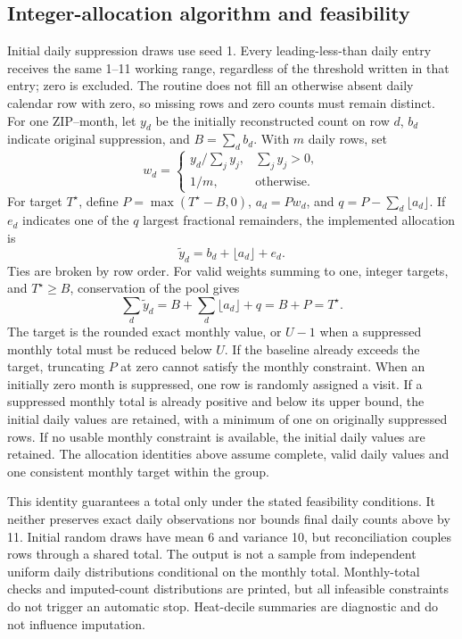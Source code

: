\documentclass[11pt,letterpaper]{article}
\begin{document}
\subsection{Integer-allocation algorithm and feasibility}
\label{supp:allocation}
Initial daily suppression draws use seed 1. Every leading-less-than daily entry receives the same 1--11 working range, regardless of the threshold written in that entry; zero is excluded. The routine does not fill an otherwise absent daily calendar row with zero, so missing rows and zero counts must remain distinct.
For one ZIP--month, let \(y_d\) be the initially reconstructed count on row \(d\), \(b_d\) indicate original suppression, and \(B=\sum_db_d\). With \(m\) daily rows, set
\begin{equation}
 w_d=\begin{cases}y_d/\sum_jy_j,&\sum_jy_j>0,\\1/m,&\text{otherwise.}\end{cases}
\end{equation}
For target \(T^\star\), define \(P=\max(T^\star-B,0)\), \(a_d=Pw_d\), and \(q=P-\sum_d\lfloor a_d\rfloor\). If \(e_d\) indicates one of the \(q\) largest fractional remainders, the implemented allocation is
\begin{equation}
 \widetilde y_d=b_d+\lfloor a_d\rfloor+e_d.
\end{equation}
Ties are broken by row order. For valid weights summing to one, integer targets, and \(T^\star\ge B\), conservation of the pool gives
\begin{equation}
 \sum_d\widetilde y_d
 =B+\sum_d\lfloor a_d\rfloor+q=B+P=T^\star.
\end{equation}
The target is the rounded exact monthly value, or \(U-1\) when a suppressed monthly total must be reduced below \(U\). If the baseline already exceeds the target, truncating \(P\) at zero cannot satisfy the monthly constraint. When an initially zero month is suppressed, one row is randomly assigned a visit.
If a suppressed monthly total is already positive and below its upper bound, the initial daily values are retained, with a minimum of one on originally suppressed rows. If no usable monthly constraint is available, the initial daily values are retained. The allocation identities above assume complete, valid daily values and one consistent monthly target within the group.

This identity guarantees a total only under the stated feasibility conditions. It neither preserves exact daily observations nor bounds final daily counts above by 11. Initial random draws have mean 6 and variance 10, but reconciliation couples rows through a shared total. The output is not a sample from independent uniform daily distributions conditional on the monthly total. Monthly-total checks and imputed-count distributions are printed, but all infeasible constraints do not trigger an automatic stop. Heat-decile summaries are diagnostic and do not influence imputation.
\end{document}

